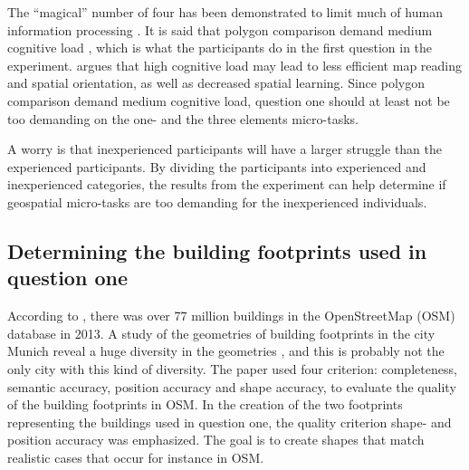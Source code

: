 The “magical” number of four has been demonstrated to limit much of human information processing \citep{Mandler2013}. It is said that polygon comparison demand medium cognitive load \citep{Kiefer2016}, which is what the participants do in the first question in the experiment. \cite{Kiefer2016} argues that high cognitive load may lead to less efficient map reading and spatial orientation, as well as decreased spatial learning. Since polygon comparison demand medium cognitive load, question one should at least not be too demanding on the one- and the three elements micro-tasks. 

A worry is that inexperienced participants will have a larger struggle than the experienced participants.  By dividing the participants into experienced and inexperienced categories, the results from the experiment can help determine if geospatial micro-tasks are too demanding for the inexperienced individuals. 

\subsection[Building shapes]{Determining the building footprints used in question one}


According to \cite{Fan2014}, there was over 77 million buildings in the OpenStreetMap (OSM) database in 2013. A study of the geometries of building footprints in the city Munich reveal a huge diversity in the geometries \citep{Fan2014}, and this is probably not the only city with this kind of diversity. The \cite{Fan2014} paper used four criterion: completeness, semantic accuracy, position accuracy and shape accuracy, to evaluate the quality of the building footprints in OSM. In the creation of the two footprints representing the buildings used in question one, the quality criterion shape- and position accuracy was emphasized. The goal is to create shapes that match realistic cases that occur for instance in OSM. 


